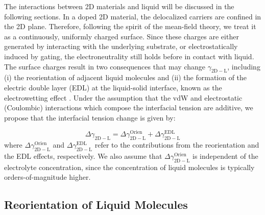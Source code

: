 The interactions between 2D materials and liquid will be discussed in
the following sections. In a doped 2D material, the delocalized carriers
are confined in the 2D plane. Therefore, following the spirit of the
mean-field theory, we treat it as a continuously, uniformly charged
surface. Since these charges are either generated by interacting with
the underlying substrate, or electrostatically induced by gating, the
electroneutrality still holds before in contact with liquid.
%
The surface charges result in two consequences that may change
\(\gamma_{\mathrm{2D-L}}\), including (i) the reorientation of
adjacent liquid molecules \cite{Ostrowski_2014_tunable} and (ii) the
formation of the electric double layer (EDL) at the liquid-solid
interface, known as the electrowetting effect
\cite{Lippmann_1908,Mugele_2005_EW_rev}. Under the assumption that the
vdW and electrostatic (Coulombic) interactions which compose the
interfacial tension are additive, we propose that the interfacial
tension change is given by:

\begin{equation}
\label{eqn:wet-delta-gamma-decompose}
\Delta \gamma_{\mathrm{2D-L}} = \Delta \gamma_{\mathrm{2D-L}}^{\mathrm{Orien}}
                              + \Delta \gamma_{\mathrm{2D-L}}^{\mathrm{EDL}}
\end{equation}
where \(\Delta \gamma_{\mathrm{2D-L}}^{\mathrm{Orien}}\) and \(\Delta
\gamma_{\mathrm{2D-L}}^{\mathrm{EDL}}\) refer to the contributions
from the reorientation and the EDL effects, respectively.
%
We also
assume that \(\Delta \gamma_{\mathrm{2D-L}}^{\mathrm{Orien}}\) is independent of
the electrolyte concentration, since the concentration of liquid
molecules is typically orders-of-magnitude higher.



\subsection{Reorientation of Liquid Molecules}
\label{sec:wet-reorien}


